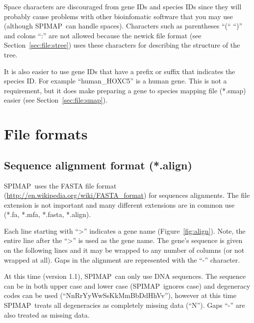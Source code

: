 \documentclass[11pt]{article}
\newcommand{\figref}[1]{Figure~\ref{#1}}
\newcommand{\secref}[1]{Section~\ref{#1}}
\newcommand{\spimap}{{\sf\scshape SPIMAP}}
\begin{document}
Space characters are discouraged from gene IDs and species IDs since
they will probably cause problems with other bioinfomatic software
that you may use (although \spimap\ can handle spaces).  Characters
such as parentheses ``(`` ``)'' and colons ``:'' are not allowed
because the newick file format (see \secref{sec:file:stree}) uses these
characters for describing the structure of the tree.

It is also easier to use gene IDs that have a prefix or suffix that indicates
the species ID.  For example ``human\_HOXC5'' is a human gene.  This is not
a requirement, but it does make preparing a gene to species mapping 
file (*.smap) easier (see \secref{sec:file:smap}).



\section{File formats}

\subsection{Sequence alignment format (*.align)}
\label{sec:file:align}

\spimap\ uses the FASTA file format
(\url{http://en.wikipedia.org/wiki/FASTA\_format}) for sequences
alignments.  The file extension is not important and many different 
extensions are in common use (*.fa, *.mfa, *.fasta, *.align).

Each line starting with ``>'' indicates a gene name
(\figref{fig:align}).  Note, the entire line after the ``>'' is used as the
gene name.  The gene's sequence is given on the following
lines and it may be wrapped to any number of columns (or not wrapped at
all).  Gaps in the alignment are represented with the ``-'' character.

At this time (version 1.1), \spimap\ can only use DNA sequences.  The
sequence can be in both upper case and lower case (\spimap\ ignores
case) and degeneracy codes can be used (``NnRrYyWwSsKkMmBbDdHhVv''),
however at this time \spimap\ treats all degeneracies as completely
missing data (``N'').  Gaps ``-'' are also treated as missing data.
\end{document}

